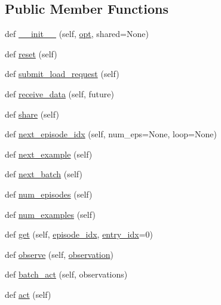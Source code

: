\subsection*{Public Member Functions}
\begin{DoxyCompactItemize}
\item 
def \hyperlink{classparlai_1_1core_1_1teachers_1_1FixedDialogTeacher_adbbee971d8b6eabae13165060e901c40}{\+\_\+\+\_\+init\+\_\+\+\_\+} (self, \hyperlink{classparlai_1_1core_1_1agents_1_1Teacher_a3ce6243860ce978a897922863ed32fa4}{opt}, shared=None)
\item 
def \hyperlink{classparlai_1_1core_1_1teachers_1_1FixedDialogTeacher_af0e1160f17d43ace896f71c190e4e5ec}{reset} (self)
\item 
def \hyperlink{classparlai_1_1core_1_1teachers_1_1FixedDialogTeacher_a8923ee1255939443c7a6ea1532a2fe40}{submit\+\_\+load\+\_\+request} (self)
\item 
def \hyperlink{classparlai_1_1core_1_1teachers_1_1FixedDialogTeacher_a001ed7924490d0e291588c54d383384a}{receive\+\_\+data} (self, future)
\item 
def \hyperlink{classparlai_1_1core_1_1teachers_1_1FixedDialogTeacher_af1501d26676b7cf0ed8f41d51c31e686}{share} (self)
\item 
def \hyperlink{classparlai_1_1core_1_1teachers_1_1FixedDialogTeacher_a7fccfc09aef3510f8bb9834398eff8e9}{next\+\_\+episode\+\_\+idx} (self, num\+\_\+eps=None, loop=None)
\item 
def \hyperlink{classparlai_1_1core_1_1teachers_1_1FixedDialogTeacher_aa6782a610b00aa0675522aa58b03f20c}{next\+\_\+example} (self)
\item 
def \hyperlink{classparlai_1_1core_1_1teachers_1_1FixedDialogTeacher_a49100faf9af79c6e24ddac9e36151d54}{next\+\_\+batch} (self)
\item 
def \hyperlink{classparlai_1_1core_1_1teachers_1_1FixedDialogTeacher_a51e3463e7b7b44a6ea8b43fc82aacb75}{num\+\_\+episodes} (self)
\item 
def \hyperlink{classparlai_1_1core_1_1teachers_1_1FixedDialogTeacher_a38bd0d5c98506c45eb87d6db32d1c0bf}{num\+\_\+examples} (self)
\item 
def \hyperlink{classparlai_1_1core_1_1teachers_1_1FixedDialogTeacher_a7c4cbfbe5cf6e9dbdf8c00d140ef4e7e}{get} (self, \hyperlink{classparlai_1_1core_1_1teachers_1_1FixedDialogTeacher_afd4ebab8063eb42d182d30a1a41f133e}{episode\+\_\+idx}, \hyperlink{classparlai_1_1core_1_1teachers_1_1FixedDialogTeacher_ae3201b15f3c3b46a2f3511bad9b43e7d}{entry\+\_\+idx}=0)
\item 
def \hyperlink{classparlai_1_1core_1_1teachers_1_1FixedDialogTeacher_a32febe29909f7523b0d7b5ee7335fd05}{observe} (self, \hyperlink{classparlai_1_1core_1_1agents_1_1Agent_aedbecc4b4aa7af7413882a0429e0f1db}{observation})
\item 
def \hyperlink{classparlai_1_1core_1_1teachers_1_1FixedDialogTeacher_afa75426a7578e8aad5b74964219345be}{batch\+\_\+act} (self, observations)
\item 
def \hyperlink{classparlai_1_1core_1_1teachers_1_1FixedDialogTeacher_a759b2dcb341b657fda29c71a7a5354b4}{act} (self)
\end{DoxyCompactItemize}
